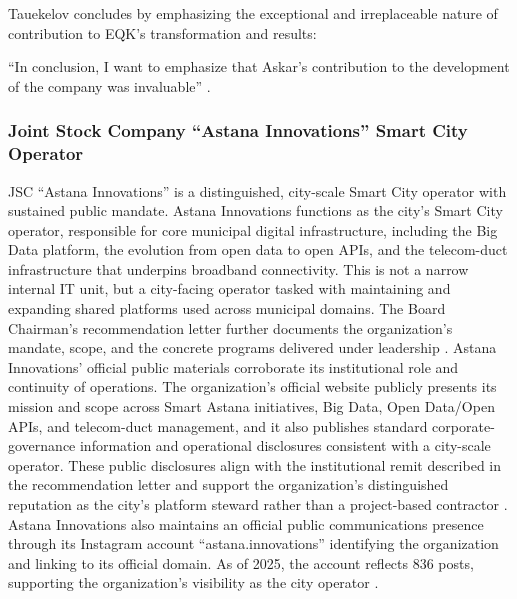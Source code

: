 Tauekelov concludes by emphasizing the exceptional and irreplaceable nature of \mrls contribution to EQK’s transformation and results:
\begin{fullquote}
``In conclusion, I want to emphasize that Askar’s contribution to the development of the company was invaluable'' . 
\end{fullquote}


\subsubsection{Joint Stock Company “Astana Innovations” Smart City Operator}

\label{subsubsec:RoleAIN}

JSC “Astana Innovations” is a distinguished, city-scale Smart City operator with sustained public mandate.
Astana Innovations functions as the city’s Smart City operator, responsible for core municipal digital infrastructure, including the Big Data platform, the evolution from open data to open APIs, and the telecom-duct infrastructure that underpins broadband connectivity. This is not a narrow internal IT unit, but a city-facing operator tasked with maintaining and expanding shared platforms used across municipal domains. The Board Chairman’s recommendation letter further documents the organization’s mandate, scope, and the concrete programs delivered under \mrls leadership  .
Astana Innovations’ official public materials corroborate its institutional role and continuity of operations. The organization’s official website publicly presents its mission and scope across Smart Astana initiatives, Big Data, Open Data/Open APIs, and telecom-duct management, and it also publishes standard corporate-governance information and operational disclosures consistent with a city-scale operator. These public disclosures align with the institutional remit described in the recommendation letter and support the organization’s distinguished reputation as the city’s platform steward rather than a project-based contractor .
Astana Innovations also maintains an official public communications presence through its Instagram account ``astana.innovations'' identifying the organization and linking to its official domain. As of 2025, the account reflects 836 posts, supporting the organization’s visibility as the city operator .

